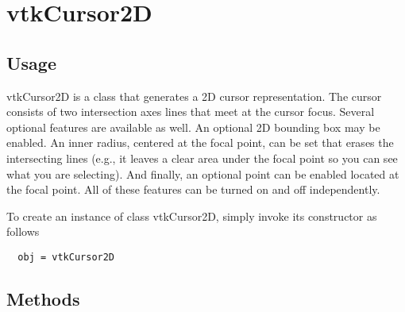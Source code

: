 \section{vtkCursor2D}

\subsection{Usage}

 vtkCursor2D is a class that generates a 2D cursor representation.
 The cursor consists of two intersection axes lines that meet at the
 cursor focus. Several optional features are available as well. An 
 optional 2D bounding box may be enabled. An inner radius, centered at
 the focal point, can be set that erases the intersecting lines (e.g.,
 it leaves a clear area under the focal point so you can see
 what you are selecting). And finally, an optional point can be
 enabled located at the focal point. All of these features can be turned
 on and off independently.


To create an instance of class vtkCursor2D, simply
invoke its constructor as follows
\begin{verbatim}
  obj = vtkCursor2D
\end{verbatim}
\subsection{Methods}

